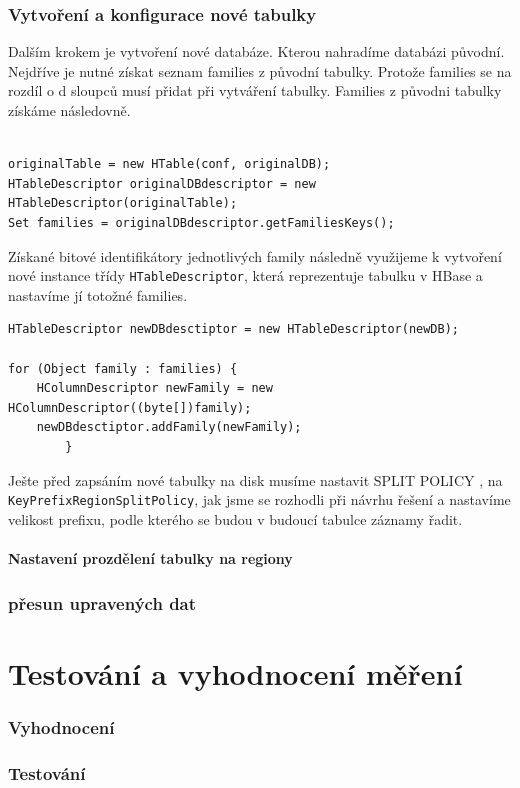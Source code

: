 \documentclass[thesis=M,czech]{FITthesis}[2012/06/26]
\begin{document}
\subsection{Vytvoření a konfigurace nové tabulky}
Dalším krokem je vytvoření nové databáze. Kterou nahradíme databázi původní. Nejdříve je nutné získat seznam families z původní tabulky. Protože families se na rozdíl o d sloupců musí přidat při vytváření tabulky. Families z původni tabulky získáme následovně.
\begin{lstlisting}[frame=single]  % Start your code-block

originalTable = new HTable(conf, originalDB);
HTableDescriptor originalDBdescriptor = new HTableDescriptor(originalTable);
Set families = originalDBdescriptor.getFamiliesKeys();
\end{lstlisting}
Získané bitové identifikátory jednotlivých family následně využijeme k vytvoření nové instance třídy \texttt{HTableDescriptor}, která reprezentuje tabulku v HBase a nastavíme jí totožné families.
\begin{lstlisting}[frame=single]  % Start your code-block
HTableDescriptor newDBdesctiptor = new HTableDescriptor(newDB);

for (Object family : families) {
    HColumnDescriptor newFamily = new HColumnDescriptor((byte[])family);
    newDBdesctiptor.addFamily(newFamily);
        }
\end{lstlisting}
Ješte před zapsáním nové tabulky na disk musíme nastavit SPLIT POLICY , na \texttt{KeyPrefixRegionSplitPolicy}, jak jsme se rozhodli při návrhu řešení a nastavíme velikost prefixu, podle kterého se budou v budoucí tabulce záznamy řadit.


\subsubsection{Nastavení prozdělení tabulky na regiony}
\subsection{přesun upravených dat}


\chapter{Testování a vyhodnocení měření}
\subsection{Vyhodnocení}
\subsection{Testování}
\end{document}
